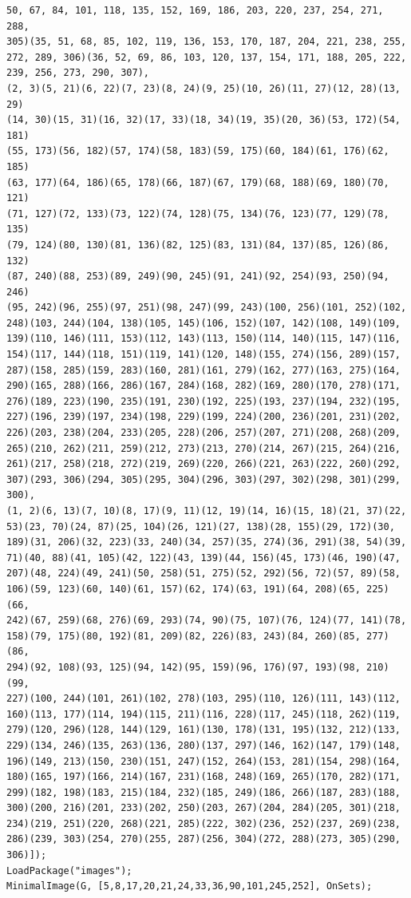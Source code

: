 \begin{verbatim}
50, 67, 84, 101, 118, 135, 152, 169, 186, 203, 220, 237, 254, 271, 288, 
305)(35, 51, 68, 85, 102, 119, 136, 153, 170, 187, 204, 221, 238, 255, 
272, 289, 306)(36, 52, 69, 86, 103, 120, 137, 154, 171, 188, 205, 222, 
239, 256, 273, 290, 307), 
(2, 3)(5, 21)(6, 22)(7, 23)(8, 24)(9, 25)(10, 26)(11, 27)(12, 28)(13, 29)
(14, 30)(15, 31)(16, 32)(17, 33)(18, 34)(19, 35)(20, 36)(53, 172)(54, 181)
(55, 173)(56, 182)(57, 174)(58, 183)(59, 175)(60, 184)(61, 176)(62, 185)
(63, 177)(64, 186)(65, 178)(66, 187)(67, 179)(68, 188)(69, 180)(70, 121)
(71, 127)(72, 133)(73, 122)(74, 128)(75, 134)(76, 123)(77, 129)(78, 135)
(79, 124)(80, 130)(81, 136)(82, 125)(83, 131)(84, 137)(85, 126)(86, 132)
(87, 240)(88, 253)(89, 249)(90, 245)(91, 241)(92, 254)(93, 250)(94, 246)
(95, 242)(96, 255)(97, 251)(98, 247)(99, 243)(100, 256)(101, 252)(102, 
248)(103, 244)(104, 138)(105, 145)(106, 152)(107, 142)(108, 149)(109, 
139)(110, 146)(111, 153)(112, 143)(113, 150)(114, 140)(115, 147)(116, 
154)(117, 144)(118, 151)(119, 141)(120, 148)(155, 274)(156, 289)(157, 
287)(158, 285)(159, 283)(160, 281)(161, 279)(162, 277)(163, 275)(164, 
290)(165, 288)(166, 286)(167, 284)(168, 282)(169, 280)(170, 278)(171, 
276)(189, 223)(190, 235)(191, 230)(192, 225)(193, 237)(194, 232)(195, 
227)(196, 239)(197, 234)(198, 229)(199, 224)(200, 236)(201, 231)(202, 
226)(203, 238)(204, 233)(205, 228)(206, 257)(207, 271)(208, 268)(209, 
265)(210, 262)(211, 259)(212, 273)(213, 270)(214, 267)(215, 264)(216, 
261)(217, 258)(218, 272)(219, 269)(220, 266)(221, 263)(222, 260)(292, 
307)(293, 306)(294, 305)(295, 304)(296, 303)(297, 302)(298, 301)(299, 
300), 
(1, 2)(6, 13)(7, 10)(8, 17)(9, 11)(12, 19)(14, 16)(15, 18)(21, 37)(22, 
53)(23, 70)(24, 87)(25, 104)(26, 121)(27, 138)(28, 155)(29, 172)(30, 
189)(31, 206)(32, 223)(33, 240)(34, 257)(35, 274)(36, 291)(38, 54)(39, 
71)(40, 88)(41, 105)(42, 122)(43, 139)(44, 156)(45, 173)(46, 190)(47, 
207)(48, 224)(49, 241)(50, 258)(51, 275)(52, 292)(56, 72)(57, 89)(58, 
106)(59, 123)(60, 140)(61, 157)(62, 174)(63, 191)(64, 208)(65, 225)(66, 
242)(67, 259)(68, 276)(69, 293)(74, 90)(75, 107)(76, 124)(77, 141)(78, 
158)(79, 175)(80, 192)(81, 209)(82, 226)(83, 243)(84, 260)(85, 277)(86, 
294)(92, 108)(93, 125)(94, 142)(95, 159)(96, 176)(97, 193)(98, 210)(99, 
227)(100, 244)(101, 261)(102, 278)(103, 295)(110, 126)(111, 143)(112, 
160)(113, 177)(114, 194)(115, 211)(116, 228)(117, 245)(118, 262)(119, 
279)(120, 296)(128, 144)(129, 161)(130, 178)(131, 195)(132, 212)(133, 
229)(134, 246)(135, 263)(136, 280)(137, 297)(146, 162)(147, 179)(148, 
196)(149, 213)(150, 230)(151, 247)(152, 264)(153, 281)(154, 298)(164, 
180)(165, 197)(166, 214)(167, 231)(168, 248)(169, 265)(170, 282)(171, 
299)(182, 198)(183, 215)(184, 232)(185, 249)(186, 266)(187, 283)(188, 
300)(200, 216)(201, 233)(202, 250)(203, 267)(204, 284)(205, 301)(218, 
234)(219, 251)(220, 268)(221, 285)(222, 302)(236, 252)(237, 269)(238, 
286)(239, 303)(254, 270)(255, 287)(256, 304)(272, 288)(273, 305)(290, 
306)]);
LoadPackage("images");
MinimalImage(G, [5,8,17,20,21,24,33,36,90,101,245,252], OnSets);
\end{verbatim}
